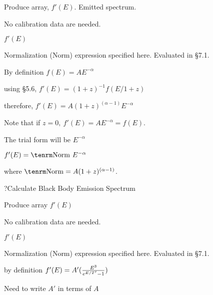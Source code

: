 {\listlist


Produce array, $f'(E)$.  Emitted spectrum.


}

{\parindent \vbox{}}

{\listlist

No calibration data are needed.


$f'(E)$

Normalization (Norm) expression specified here.  Evaluated in \S7.1.


By definition $f(E) = AE^{-\alpha}$

using \S5.6, $f'(E) = (1+z)^{-1} f(E/1+z)$

therefore, $f'(E) = A(1+z)^{(\alpha-1)}E^{-\alpha}$

Note that if $z=0,~f'(E) = AE^{-\alpha} = f(E).$

The trial form will be $E^{-\alpha}$

$f'(E) = {\rm Norm}~E^{-\alpha}$

where ${\rm Norm} = A(1+z)^{(\alpha-1)}$.

}

\??Calculate Black Body Emission Spectrum

{\listlist


Produce array $f'(E)$


}

{\parindent \vbox{}}

{\listlist
 
No calibration data are needed.


$f'(E)$

Normalization (Norm) expression specified here. Evaluated in \S7.1.


by definition $f'(E) = A'({E^{3}\over e^{E/T'}-1})$

Need to write $A'$ in terms of $A$

}

